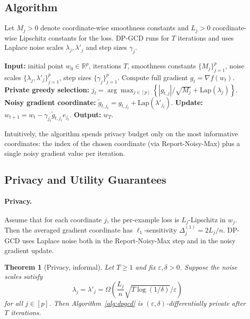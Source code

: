 \documentclass[11pt,a4paper]{article}
\newtheorem{theorem}{Theorem}
\begin{document}
\subsection{Algorithm}

Let $M_j > 0$ denote coordinate-wise smoothness constants and $L_j > 0$ coordinate-wise Lipschitz constants for the loss. DP-GCD runs for $T$ iterations and uses Laplace noise scales $\lambda_j, \lambda'_j$ and step sizes $\gamma_j$.

\begin{algorithm}[h]
\caption{DP-GCD: Differentially Private Greedy Coordinate Descent}
\label{alg:dpgcd}
\begin{algorithmic}[1]
\State \textbf{Input:} initial point $w_0 \in \mathbb{R}^p$, iterations $T$, smoothness constants $\{M_j\}_{j=1}^p$, noise scales $\{\lambda_j, \lambda'_j\}_{j=1}^p$, step sizes $\{\gamma_j\}_{j=1}^p$.
    \State Compute full gradient $g_t = \nabla f(w_t)$.
    \State \textbf{Private greedy selection:} $j_t = \arg\max_{j \in [p]} \left\{ |g_{t,j}|/\sqrt{M_j} + \mathrm{Lap}(\lambda_j) \right\}$.
    \State \textbf{Noisy gradient coordinate:} $\tilde{g}_{t,j_t} = g_{t,j_t} + \mathrm{Lap}(\lambda'_{j_t})$.
    \State \textbf{Update:} $w_{t+1} = w_t - \gamma_{j_t} \tilde{g}_{t,j_t} e_{j_t}$.
\EndFor
\State \textbf{Output:} $w_T$.
\end{algorithmic}
\end{algorithm}

Intuitively, the algorithm spends privacy budget only on the most informative coordinates: the index of the chosen coordinate (via Report-Noisy-Max) plus a single noisy gradient value per iteration.

\subsection{Privacy and Utility Guarantees}

\paragraph{Privacy.} Assume that for each coordinate $j$, the per-example loss is $L_j$-Lipschitz in $w_j$. Then the averaged gradient coordinate has $\ell_1$-sensitivity $\Delta_j^{(1)} = 2L_j/n$. DP-GCD uses Laplace noise both in the Report-Noisy-Max step and in the noisy gradient update.

\begin{theorem}[Privacy, informal]
\label{thm:privacy}
Let $T \geq 1$ and fix $\varepsilon, \delta > 0$. Suppose the noise scales satisfy
\[
\lambda_j = \lambda'_j = \Omega\!\left( \frac{L_j}{n} \sqrt{T \log(1/\delta)}/\varepsilon \right)
\]
for all $j \in [p]$. Then Algorithm~\ref{alg:dpgcd} is $(\varepsilon, \delta)$-differentially private after $T$ iterations.
\end{theorem}
\end{document}
